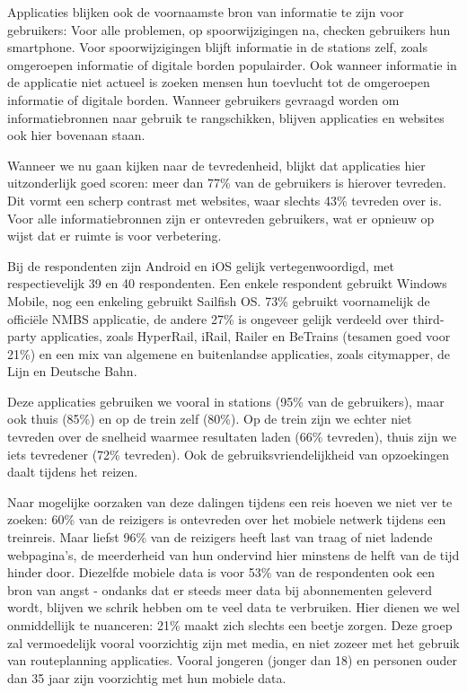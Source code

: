 Applicaties blijken ook de voornaamste bron van informatie te zijn voor gebruikers: Voor alle problemen, op spoorwijzigingen na, checken gebruikers hun smartphone. Voor spoorwijzigingen blijft informatie in de stations zelf, zoals omgeroepen informatie of digitale borden populairder. Ook wanneer informatie in de applicatie niet actueel is zoeken mensen hun toevlucht tot de omgeroepen informatie of digitale borden. Wanneer gebruikers gevraagd worden om informatiebronnen naar gebruik te rangschikken, blijven applicaties en websites ook hier bovenaan staan.

Wanneer we nu gaan kijken naar de tevredenheid, blijkt dat applicaties hier uitzonderlijk goed scoren: meer dan 77\% van de gebruikers is hierover tevreden. Dit vormt een scherp contrast met websites, waar slechts 43\% tevreden over is. Voor alle informatiebronnen zijn er ontevreden gebruikers, wat er opnieuw op wijst dat er ruimte is voor verbetering.

Bij de respondenten zijn Android en iOS gelijk vertegenwoordigd, met respectievelijk 39 en 40 respondenten. Een enkele respondent gebruikt Windows Mobile, nog een enkeling gebruikt Sailfish OS. 73\% gebruikt voornamelijk de officiële NMBS applicatie, de andere 27\% is ongeveer gelijk verdeeld over third-party applicaties, zoals HyperRail, iRail, Railer en BeTrains (tesamen goed voor 21\%) en een mix van algemene en buitenlandse applicaties, zoals citymapper, de Lijn en Deutsche Bahn.

Deze applicaties gebruiken we vooral in stations (95\% van de gebruikers), maar ook thuis (85\%) en op de trein zelf (80\%). Op de trein zijn we echter niet tevreden over de snelheid waarmee resultaten laden (66\% tevreden), thuis zijn we iets tevredener (72\% tevreden). Ook de gebruiksvriendelijkheid van opzoekingen daalt tijdens het reizen. 

Naar mogelijke oorzaken van deze dalingen tijdens een reis hoeven we niet ver te zoeken: 60\% van de reizigers is ontevreden over het mobiele netwerk tijdens een treinreis. Maar liefst 96\% van de reizigers heeft last van traag of niet ladende webpagina's, de meerderheid van hun ondervind hier minstens de helft van de tijd hinder door. Diezelfde mobiele data is voor 53\% van de respondenten ook een bron van angst - ondanks dat er steeds meer data bij abonnementen geleverd wordt, blijven we schrik hebben om te veel data te verbruiken. Hier dienen we wel onmiddellijk te nuanceren: 21\% maakt zich slechts een beetje zorgen. Deze groep zal vermoedelijk vooral voorzichtig zijn met media, en niet zozeer met het gebruik van routeplanning applicaties. Vooral jongeren (jonger dan 18) en personen ouder dan 35 jaar zijn voorzichtig met hun mobiele data.

